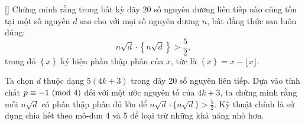 \documentclass[../03-arithmetic-functions.tex]{subfiles}
\begin{document}
\begin{example*}\label{example:BMO-2015-P4}[\textbf{}]
    Chứng minh rằng trong bất kỳ dãy \( 20 \) số nguyên dương liên tiếp nào cũng tồn tại một số nguyên \( d \) sao cho với mọi số nguyên dương \( n \),
    bất đẳng thức sau luôn đúng:
    \[
        n \sqrt{d} \cdot \left\{n \sqrt{d} \right\} > \frac{5}{2},
    \]
    trong đó \( \left\{ x \right\} \) ký hiệu phần thập phân của \( x \), tức là \( \left\{ x \right\} = x - \lfloor x \rfloor \).
\end{example*}

\begin{story*}
    Ta chọn \( d \) thuộc dạng \( 5(4k + 3) \) trong dãy 20 số nguyên liên tiếp. Dựa vào tính chất \( p \equiv -1 \ (\mathrm{mod}\ 4) \) đối với một ước nguyên tố của \( 4k+3 \), ta chứng minh rằng mỗi \( n\sqrt{d} \) có phần thập phân đủ lớn để \( n\sqrt{d} \cdot \{n\sqrt{d}\} > \tfrac{5}{2} \). Kỹ thuật chính là sử dụng chia hết theo mô-đun 4 và 5 để loại trừ những khả năng nhỏ hơn.
\end{story*}

\bigbreak
\end{document}
